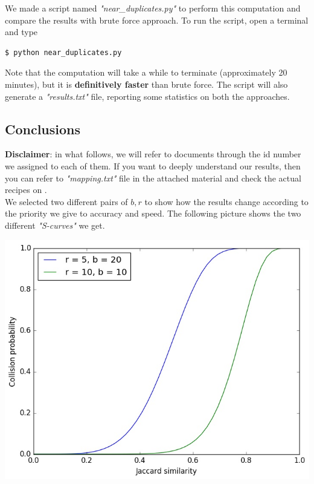 \noindent We made a script named \textit{"near\_duplicates.py"} to perform this computation and compare the results with brute force approach. To run the script, open a terminal and type
\begin{lstlisting}
$ python near_duplicates.py
\end{lstlisting}
\medskip

\noindent Note that the computation will take a while to terminate (approximately 20 minutes), but it is \textbf{definitively faster} than brute force. The script will also generate a \textit{"results.txt"} file, reporting some statistics on both the approaches.

\subsection{Conclusions}

\textbf{Disclaimer}: in what follows, we will refer to documents through the id number we assigned to each of them. If you want to deeply understand our results, then you can refer to \textit{"mapping.txt"} file in the attached material and check the actual recipes on \cite{bbc}.\\

\noindent We selected two different pairs of $b,r$ to show how the results change according to the priority we give to accuracy and speed. The following picture shows the two different \textit{"S-curves"} we get.

\begin{center}
	\includegraphics[scale=0.45]{img/lsh_probability.jpg}
\end{center}

